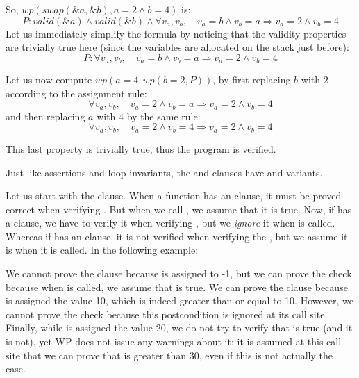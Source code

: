 So, $wp(swap(\&a, \&b), a = 2 \wedge b = 4)$ is:
$$P: valid(\&a) \wedge valid(\&b) \wedge \forall v_a, v_b, \quad v_a = b \wedge v_b = a \Rightarrow v_a = 2 \wedge v_b = 4$$
Let us immediately simplify the formula by noticing that the validity properties
are trivially true here (since the variables are allocated on the stack just
before):
$$P: \forall v_a, v_b, \quad v_a = b \wedge v_b = a \Rightarrow v_a = 2 \wedge v_b = 4$$


Let us now compute $wp(a = 4, wp(b = 2, P))$, by first replacing $b$ with
$2$ according to the assignment rule:
$$\forall v_a, v_b, \quad v_a = 2 \wedge v_b = a \Rightarrow v_a = 2 \wedge v_b = 4$$
and then replacing $a$ with $4$ by the same rule:
$$\forall v_a, v_b, \quad v_a = 2 \wedge v_b = 4 \Rightarrow v_a = 2 \wedge v_b = 4$$


This last property is trivially true, thus the program is verified.




Just like assertions and loop invariants, the  and
 clauses have 
and  variants.


Let us start with the  clause. When a function
 has an  clause, it must be proved correct
when verifying . But when we call , we
assume that it is true. Now, if  has a 
clause, we have to verify it when verifying , but we
\textit{ignore} it when  is called. Whereas if
 has an  clause, it is not verified when
verifying the , but we assume it is when it is called. In the
following example:



We cannot prove the clause  because  is assigned
to -1, but we can prove the check  because when  is
called, we assume that  is true. We can prove the clause
 because  is assigned the value 10, which is indeed greater
than or equal to 10. However, we cannot prove the check  because
this postcondition is ignored at its call site. Finally, while  is
assigned the value 20, we do not try to verify that  is true (and it is
not), yet WP does not issue any warnings about it: it is assumed at
this call site that we can
prove that  is greater than 30, even if this is not
actually the case.

